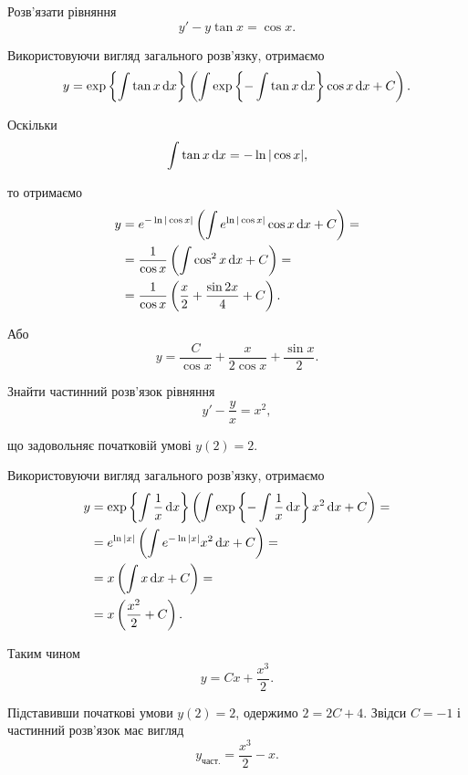 \begin{example}
	Розв'язати рівняння \[ y' - y \tan x = \cos x.\]
\end{example}

\begin{solution}
	Використовуючи вигляд загального розв'язку, отримаємо \[ y = \exp\left\{\int \tan x \mathop{}\!\mathrm{d} x\right\} \left(\int \exp\left\{-\int\tan x\mathop{}\!\mathrm{d} x\right\} \cos x \mathop{}\!\mathrm{d} x + C \right). \]

	Оскільки \[\int \tan x \mathop{}\!\mathrm{d} x = - \ln |\cos x|,\] 

	то отримаємо
	\begin{align*}
		y &= e^{-\ln|\cos x|} \left(\int e^{\ln|\cos x|} \cos x \mathop{}\!\mathrm{d} x+C\right) = \\
		&= \frac{1}{\cos x} \left( \int \cos^2 x \mathop{}\!\mathrm{d} x + C \right) = \\
		&= \frac{1}{\cos x} \left( \frac x2 + \frac{\sin 2x}{4} + C \right).
	\end{align*}
	
	Або
	\[ y = \frac{C}{\cos x} + \frac{x}{2 \cos x} + \frac{\sin x}{2}. \]
\end{solution}

\begin{example}
	Знайти частинний розв'язок рівняння \[ y' - \frac yx = x^2,\] 

	що задовольняє початковій умові $y(2) = 2$.
\end{example}

\begin{solution}
	Використовуючи вигляд загального розв'язку, отримаємо
	\begin{align*}
		y &= \exp\left\{\int \frac1x \mathop{}\!\mathrm{d} x\right\} \left(\int \exp\left\{-\int\frac1x\mathop{}\!\mathrm{d} x\right\} x^2 \mathop{}\!\mathrm{d} x+C\right) = \\
		&= e^{\ln|x|} \left(\int e^{-\ln|x|} x^2 \mathop{}\!\mathrm{d} x+C\right) = \\
		&= x \left(\int x \mathop{}\!\mathrm{d} x+C\right) = \\
		&= x \left(\frac{x^2}{2} + C\right).
	\end{align*}

	Таким чином \[ y = C x + \frac{x^3}{2}.\]
	
	Підставивши початкові умови $y(2) = 2$, одержимо $2 = 2C + 4$. Звідси $C = -1$ і частинний розв'язок має вигляд \[ y_{\text{част.}} = \frac{x^3}{2} - x.\]
\end{solution}

